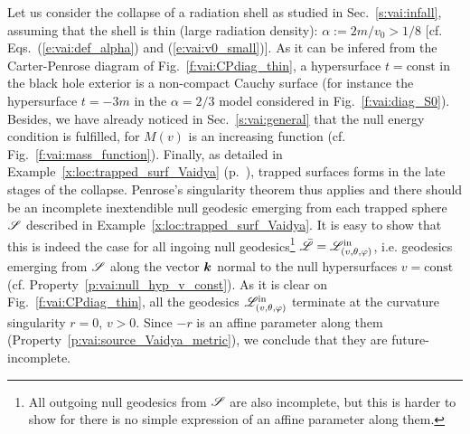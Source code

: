 \begin{example}
Let us consider the collapse of a radiation shell
as studied in Sec.~\ref{s:vai:infall}, assuming that the shell is thin
(large radiation density): $\alpha := 2m/v_0 > 1/8$
[cf. Eqs.~(\ref{e:vai:def_alpha}) and (\ref{e:vai:v0_small})].
As it can be infered from the Carter-Penrose diagram of Fig.~\ref{f:vai:CPdiag_thin},
a hypersurface $t=\mathrm{const}$ in the black hole exterior
is a non-compact Cauchy surface (for instance the hypersurface $t=-3m$ in
the $\alpha=2/3$ model considered in Fig.~\ref{f:vai:diag_S0}).
Besides, we have already noticed in Sec.~\ref{s:vai:general} that the null energy
condition is fulfilled, for $M(v)$ is an increasing function (cf. Fig.~\ref{f:vai:mass_function}).
Finally, as detailed in Example~\ref{x:loc:trapped_surf_Vaidya}
(p.~\pageref{x:loc:trapped_surf_Vaidya}), trapped surfaces forms in the late
stages of the collapse.
Penrose's singularity theorem thus applies and there should be
an incomplete inextendible null geodesic emerging from each trapped sphere $\mathscr{S}$
described in Example~\ref{x:loc:trapped_surf_Vaidya}.
It is easy to show that this is indeed the case for all ingoing null geodesics\footnote{All outgoing
null geodesics from $\mathscr{S}$ are also incomplete, but this is harder to show for there is no simple
expression of an affine parameter along them.}
$\bar{\mathscr{L}} = \mathscr{L}^{\rm in}_{(v,\theta,\varphi)}$, i.e. geodesics emerging from $\mathscr{S}$ along the vector $\bm{k}$
normal to the null hypersurfaces $v=\mathrm{const}$ (cf. Property~\ref{p:vai:null_hyp_v_const}).
As it is clear on Fig.~\ref{f:vai:CPdiag_thin}, all the geodesics $\mathscr{L}^{\rm in}_{(v,\theta,\varphi)}$
terminate at the curvature singularity $r=0$, $v>0$. Since $-r$ is an affine parameter along
them (Property~\ref{p:vai:source_Vaidya_metric}), we conclude that they are future-incomplete.
\end{example}

